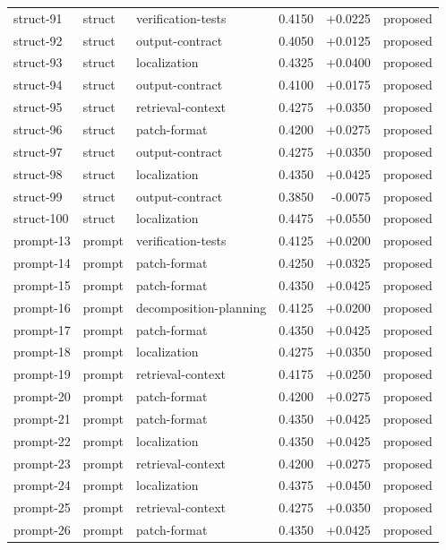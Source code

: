\begin{center}
\begin{longtable}{llp{5.2cm}rrl}
struct-91 & struct & verification-tests & 0.4150 & +0.0225 & proposed \\
struct-92 & struct & output-contract & 0.4050 & +0.0125 & proposed \\
struct-93 & struct & localization & 0.4325 & +0.0400 & proposed \\
struct-94 & struct & output-contract & 0.4100 & +0.0175 & proposed \\
struct-95 & struct & retrieval-context & 0.4275 & +0.0350 & proposed \\
struct-96 & struct & patch-format & 0.4200 & +0.0275 & proposed \\
struct-97 & struct & output-contract & 0.4275 & +0.0350 & proposed \\
struct-98 & struct & localization & 0.4350 & +0.0425 & proposed \\
struct-99 & struct & output-contract & 0.3850 & -0.0075 & proposed \\
struct-100 & struct & localization & 0.4475 & +0.0550 & proposed \\
prompt-13 & prompt & verification-tests & 0.4125 & +0.0200 & proposed \\
prompt-14 & prompt & patch-format & 0.4250 & +0.0325 & proposed \\
prompt-15 & prompt & patch-format & 0.4350 & +0.0425 & proposed \\
prompt-16 & prompt & decomposition-planning & 0.4125 & +0.0200 & proposed \\
prompt-17 & prompt & patch-format & 0.4350 & +0.0425 & proposed \\
prompt-18 & prompt & localization & 0.4275 & +0.0350 & proposed \\
prompt-19 & prompt & retrieval-context & 0.4175 & +0.0250 & proposed \\
prompt-20 & prompt & patch-format & 0.4200 & +0.0275 & proposed \\
prompt-21 & prompt & patch-format & 0.4350 & +0.0425 & proposed \\
prompt-22 & prompt & localization & 0.4350 & +0.0425 & proposed \\
prompt-23 & prompt & retrieval-context & 0.4200 & +0.0275 & proposed \\
prompt-24 & prompt & localization & 0.4375 & +0.0450 & proposed \\
prompt-25 & prompt & retrieval-context & 0.4275 & +0.0350 & proposed \\
prompt-26 & prompt & patch-format & 0.4350 & +0.0425 & proposed \\

\end{longtable}
\end{center}
